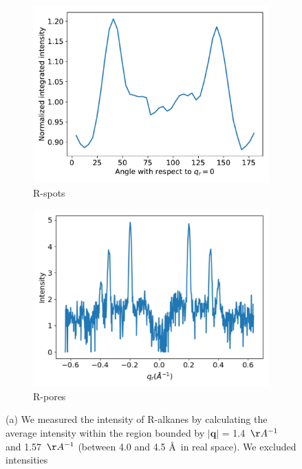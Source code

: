 \documentclass[journal=jpcbfk,manuscript=article]{achemso}
\begin{document}
\begin{figure}[!htb]
\begin{subfigure}{0.45\linewidth}
  \centering
  \includegraphics[width=\textwidth]{angular_integration.pdf} %
  \caption{R-spots}\label{fig:rspots}
  \end{subfigure}
  \begin{subfigure}{0.45\linewidth}
  \centering
  \includegraphics[width=\textwidth]{saxs_xsection.pdf}  %
  \caption{R-pores}\label{fig:saxs_xsection}
  \end{subfigure}
  \caption{(a) We measured the intensity of R-alkanes by calculating the average 
  intensity within the region bounded by $|\mathbf{q}|$ = 1.4~$\AA^{-1}$ and 
  1.57~$\AA^{-1}$ (between 4.0 and 4.5 \AA~in real space). We excluded intensities
}
\end{figure}
\end{document}
